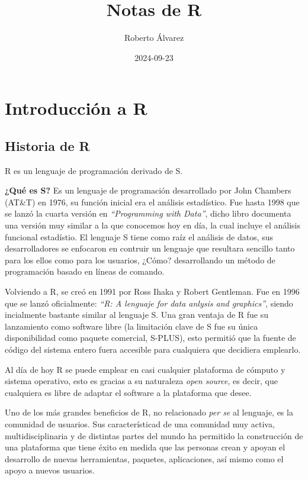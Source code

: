 \documentclass[
]{book}
\title{Notas de R}
\author{Roberto Álvarez}
\date{2024-09-23}
\begin{document}
\maketitle

{
\setcounter{tocdepth}{1}
\tableofcontents
}
\chapter{Introducción a R}\label{intro}

\section{Historia de R}\label{historia-de-r}

R es un lenguaje de programación derivado de S.

\textbf{¿Qué es S?} Es un lenguaje de programación desarrollado por John Chambers (AT\&T) en 1976, su función inicial era el análisis estadístico. Fue hasta 1998 que se lanzó la cuarta versión en \emph{``Programming with Data''}, dicho libro documenta una versión muy similar a la que conocemos hoy en día, la cual incluye el análisis funcional estadístio. El lenguaje S tiene como raíz el análisis de datos, sus desarrolladores se enfocaron en contruir un lenguaje que resultara sencillo tanto para los ellos como para los usuarios, ¿Cómo? desarrollando un método de programación basado en líneas de comando.

Volviendo a R, se creó en 1991 por Ross Ihaka y Robert Gentleman. Fue en 1996 que se lanzó oficialmente: \emph{``R: A lenguaje for data anlysis and graphics''}, siendo incialmente bastante similar al lenguaje S. Una gran ventaja de R fue su lanzamiento como software libre (la limitación clave de S fue su única disponibilidad como paquete comercial, S-PLUS), esto permitió que la fuente de código del sistema entero fuera accesible para cualquiera que decidiera emplearlo.

Al día de hoy R se puede emplear en casi cualquier plataforma de cómputo y sistema operativo, esto es gracias a su naturaleza \emph{open source}, es decir, que cualquiera es libre de adaptar el software a la plataforma que desee.

Uno de los más grandes beneficios de R, no relacionado \emph{per se} al lenguaje, es la comunidad de usuarios. Sus característicad de una comunidad muy activa, multidisciplinaria y de distintas partes del mundo ha permitido la construcción de una plataforma que tiene éxito en medida que las personas crean y apoyan el desarrollo de nuevas herramientas, paquetes, aplicaciones, así mismo como el apoyo a nuevos usuarios.
\end{document}

